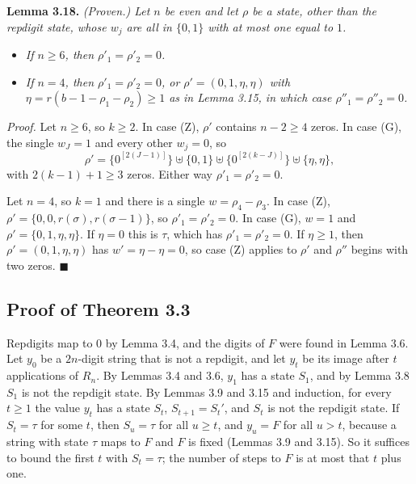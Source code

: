 \documentclass[11pt,letterpaper]{article}
\providecommand{\tightlist}{%
  \setlength{\itemsep}{0pt}\setlength{\parskip}{0pt}}
\theoremstyle{paperstyle}
\theoremstyle{paperstyledef}
\theoremstyle{paperstylerem}
\begin{document}
\textbf{Lemma 3.18.} \emph{(Proven.) Let \(n\) be even and let \(\rho\) be a state, other than the repdigit state, whose \(w_j\) are all in \(\{0, 1\}\) with at most one equal to \(1\).}

\begin{itemize}
\tightlist
\item
  \emph{If \(n \geq 6\), then \(\rho'_1 = \rho'_2 = 0\).}
\item
  \emph{If \(n = 4\), then \(\rho'_1 = \rho'_2 = 0\), or \(\rho' = (0, 1, \eta, \eta)\) with \(\eta = r(b-1-\rho_1-\rho_2) \geq 1\) as in Lemma 3.15, in which case \(\rho''_1 = \rho''_2 = 0\).}
\end{itemize}

\emph{Proof.} Let \(n \geq 6\), so \(k \geq 2\). In case (Z), \(\rho'\) contains \(n - 2 \geq 4\) zeros. In case (G), the single \(w_J = 1\) and every other \(w_j = 0\), so \[\rho' = \{0^{[2(J-1)]}\} \uplus \{0, 1\} \uplus \{0^{[2(k-J)]}\} \uplus \{\eta, \eta\},\] with \(2(k-1) + 1 \geq 3\) zeros. Either way \(\rho'_1 = \rho'_2 = 0\).

Let \(n = 4\), so \(k = 1\) and there is a single \(w = \rho_4 - \rho_3\). In case (Z), \(\rho' = \{0, 0, r(\sigma), r(\sigma-1)\}\), so \(\rho'_1 = \rho'_2 = 0\). In case (G), \(w = 1\) and \(\rho' = \{0, 1, \eta, \eta\}\). If \(\eta = 0\) this is \(\tau\), which has \(\rho'_1 = \rho'_2 = 0\). If \(\eta \geq 1\), then \(\rho' = (0, 1, \eta, \eta)\) has \(w' = \eta - \eta = 0\), so case (Z) applies to \(\rho'\) and \(\rho''\) begins with two zeros. \(\blacksquare\)

\subsection{Proof of Theorem 3.3}\label{proof-of-theorem-3.3}

Repdigits map to \(0\) by Lemma 3.4, and the digits of \(F\) were found in Lemma 3.6. Let \(y_0\) be a \(2n\)-digit string that is not a repdigit, and let \(y_t\) be its image after \(t\) applications of \(R_n\). By Lemmas 3.4 and 3.6, \(y_1\) has a state \(S_1\), and by Lemma 3.8 \(S_1\) is not the repdigit state. By Lemmas 3.9 and 3.15 and induction, for every \(t \geq 1\) the value \(y_t\) has a state \(S_t\), \(S_{t+1} = S_t'\), and \(S_t\) is not the repdigit state. If \(S_t = \tau\) for some \(t\), then \(S_u = \tau\) for all \(u \geq t\), and \(y_u = F\) for all \(u > t\), because a string with state \(\tau\) maps to \(F\) and \(F\) is fixed (Lemmas 3.9 and 3.15). So it suffices to bound the first \(t\) with \(S_t = \tau\); the number of steps to \(F\) is at most that \(t\) plus one.
\end{document}
